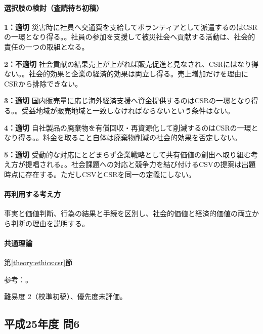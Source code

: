\paragraph{選択肢の検討（査読待ち初稿）}\mbox{}\par

\noindent\textbf{1：適切} 災害時に社員へ交通費を支給してボランティアとして派遣するのはCSRの一環となり得る。。社員の参加を支援して被災社会へ貢献する活動は、社会的責任の一つの取組となる。\par

\noindent\textbf{2：不適切} 社会貢献の結果売上が上がれば販売促進と見なされ、CSRにはなり得ない。。社会的効果と企業の経済的効果は両立し得る。売上増加だけを理由にCSRから排除できない。\par

\noindent\textbf{3：適切} 国内販売量に応じ海外経済支援へ資金提供するのはCSRの一環となり得る。。受益地域が販売地域と一致しなければならないという条件はない。\par

\noindent\textbf{4：適切} 自社製品の廃棄物を有償回収・再資源化して削減するのはCSRの一環となり得る。。料金を取ること自体は廃棄物削減の社会的効果を否定しない。\par

\noindent\textbf{5：適切} 受動的な対応にとどまらず企業戦略として共有価値の創出へ取り組む考え方が提唱される。。社会課題への対応と競争力を結び付けるCSVの提案は出題時点に存在する。ただしCSVとCSRを同一の定義にしない。\par

\paragraph{再利用する考え方} 事実と価値判断、行為の結果と手続を区別し、社会的価値と経済的価値の両立から判断の理由を説明する。

\paragraph{共通理論} \hyperref[theory:ethics:csr]{第\ref*{theory:ethics:csr}節}

\par 参考：\cite{iso26000,hbs_csv}。

\par 難易度 2（校準初稿）、優先度未評価。

\subsection{平成25年度 問6}
\label{q:h25-reg-apt-06}

